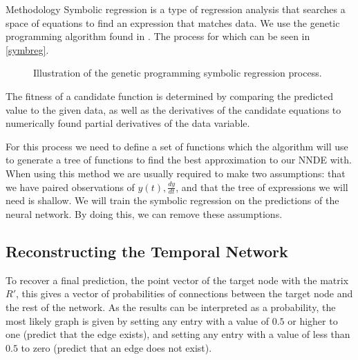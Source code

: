 \documentclass[12pt]{amsart}
\begin{document}
\begin{section}{Methodology}
        Symbolic regression is a type of regression analysis that searches a space of equations to find an expression that matches data. We use the genetic programming algorithm found in \cite{pysr}. The process for which can be seen in \autoref{symbreg}.

        \begin{figure}
            \centering
            \resizebox{\width}{!}{}
            \caption{Illustration of the genetic programming symbolic regression process.}
            \label{symbreg}
        \end{figure}
        
        The fitness of a candidate function is determined by comparing the predicted value to the given data, as well as the derivatives of the candidate equations to numerically found partial derivatives of the data variable.

        For this process we need to define a set of functions which the algorithm will use to generate a tree of functions to find the best approximation to our NNDE with. When using this method we are usually required to make two assumptions: that we have paired observations of $y(t), \frac{dy}{dt}$, and that the tree of expressions we will need is shallow. We will train the symbolic regression on the predictions of the neural network. By doing this, we can remove these assumptions\cite{kidger2022neural}.

    \subsection{Reconstructing the Temporal Network}
        To recover a final prediction, the point vector of the target node with the matrix $R'$, this gives a vector of probabilities of connections between the target node and the rest of the network. As the results can be interpreted as a probability, the most likely graph is given by setting any entry with a value of $0.5$ or higher to one (predict that the edge exists), and setting any entry with a value of less than $0.5$ to zero (predict that an edge does not exist).
\end{section}
\end{document}
